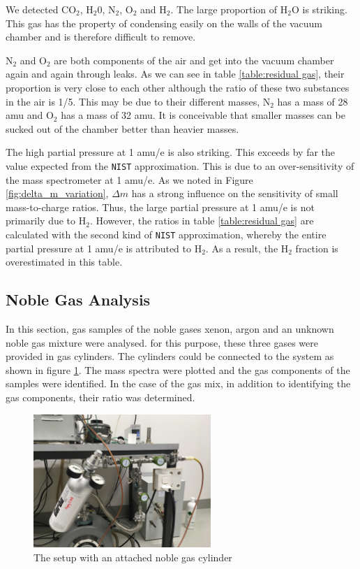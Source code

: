      We detected CO$_2$, H$_2$0, N$_2$, O$_2$ and H$_2$. The large proportion of H$_2$O is striking. This gas has the property of condensing easily on the walls of the vacuum chamber and is therefore difficult to remove.
     
     N$_2$ and O$_2$ are both components of the air and get into the vacuum chamber again and again through leaks. As we can see in table \ref{table:residual gas}, their proportion is very close to each other although the ratio of these two substances in the air is 1/5. This may be due to their different masses, N$_2$ has a mass of 28 amu and O$_2$ has a mass of 32 amu. It is conceivable that smaller masses can be sucked out of the chamber better than heavier masses.
     
    The high partial pressure at 1 amu/e is also striking. This exceeds by far the value expected from the \texttt{NIST} approximation. This is due to an over-sensitivity of the mass spectrometer at 1 amu/e. As we noted in Figure \ref{fig:delta_m_variation}, $\Delta m$ has a strong influence on the sensitivity of small mass-to-charge ratios. Thus, the large partial pressure at 1 amu/e is not primarily due to H$_2$. However, the ratios in table \ref{table:residual gas} are calculated with the second kind of \texttt{NIST} approximation, whereby the entire partial pressure at 1 amu/e is attributed to H$_2$. As a result, the H$_2$ fraction is overestimated in this table.
    
    \subsection{Noble Gas Analysis}
    
    In this section, gas samples of the noble gases xenon, argon and an unknown noble gas mixture were analysed.
    for this purpose, these three gases were provided in gas cylinders. The cylinders could be connected to the system as shown in figure \ref{fig:cartridge}. 
    The mass spectra were plotted and the gas components of the samples were identified.  In the case of the gas mix, in addition to identifying the gas components, their ratio was determined.
    
    \begin{figure}[h!]
        \centering
        \includegraphics[width=0.6\textwidth]{Report/pictures/cartridge.JPG}
        \caption{The setup with an attached noble gas cylinder}
        \label{fig:cartridge}
    \end{figure}

